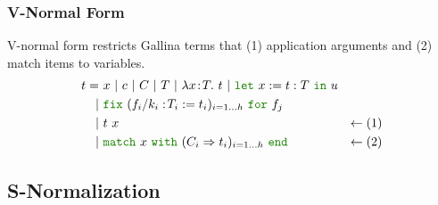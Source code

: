 \documentclass[a4paper,fleqn]{article}
\def\gallina{\textrm{Gallina}}
\newcommand{\kwlet}{\mbox{\color{mygreen}\ttfamily let}}
\newcommand{\kwin}{\mbox{\color{mygreen}\ttfamily in}}
\newcommand{\kwmatch}{\mbox{\color{mygreen}\ttfamily match}}
\newcommand{\kwwith}{\mbox{\color{mygreen}\ttfamily with}}
\newcommand{\kwend}{\mbox{\color{mygreen}\ttfamily end}}
\newcommand{\kwfix}{\mbox{\color{mygreen}\ttfamily fix}}
\newcommand{\kwfor}{\mbox{\color{mygreen}\ttfamily for}}
\newcommand{\lamT}[3]{\lambda #1\!:\!#2.~#3}
\newcommand{\letin}[3]{\kwlet~#1:=#2~\kwin~#3}
\newcommand{\match}[4]{\kwmatch~#1~\kwwith~(#2 \Rightarrow #3)_{#4}~\kwend}
\newcommand{\fixT}[5]{\kwfix~(#1:\!#2 := #3)_{#4}~\kwfor~#5}
\begin{document}
\subsubsection{V-Normal Form}\label{sec:v-normal-form}
V-normal form restricts \gallina{} terms that (1) application arguments and (2) match items to variables.
\begin{align*}
  t =&\ x~|~c~|~C~|~T~|~\lamT{x}{T}{t}~|~ \letin{x}{t:T}{u} \\
    |&\ \fixT{f_i/k_i}{T_i}{t_i}{i=1\dots h}{f_j} \\
    |&\ t~x                               & \leftarrow (1) \\
    |&\ \match{x}{C_i}{t_i}{i=1\dots h} & \leftarrow (2)
\end{align*}

\subsection{S-Normalization}\label{sec:s-normalization}
\end{document}
